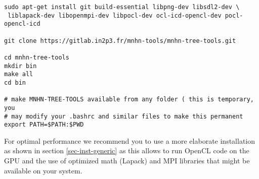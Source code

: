 \begin{lstlisting}
sudo apt-get install git build-essential libpng-dev libsdl2-dev \
 liblapack-dev libopenmpi-dev libpocl-dev ocl-icd-opencl-dev pocl-opencl-icd

git clone https://gitlab.in2p3.fr/mnhn-tools/mnhn-tree-tools.git

cd mnhn-tree-tools
mkdir bin
make all
cd bin

# make MNHN-TREE-TOOLS available from any folder ( this is temporary, you
# may modify your .bashrc and similar files to make this permanent
export PATH=$PATH:$PWD
\end{lstlisting}

For optimal performance we recommend you to use a more elaborate
installation as shown in section \ref{sec-inst-generic} as this allows
to run OpenCL code on the GPU and the use of optimized math
(Lapack) and MPI libraries that might be available on your system. 
